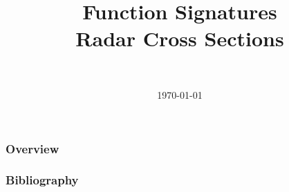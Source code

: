 \documentclass[]{beamer}
\title[Function Signatures]{Function Signatures\\Radar Cross Sections}
\author[Daniel Topa]{\TopaHII \\ \TopaHIIEmail}
\institute{\missiontech}
\date{\today}
\begin{document}
\begin{frame}
	\titlepage
\end{frame}

	

\begin{frame}\frametitle{Overview}
	\tableofcontents[hideallsubsections]
\end{frame}

	
	
	

{\tiny{
\begin{frame}[allowframebreaks]\frametitle{Bibliography}
	\printbibliography
\end{frame}}}

\begin{frame}
	\titlepage
\end{frame}
\end{document}

